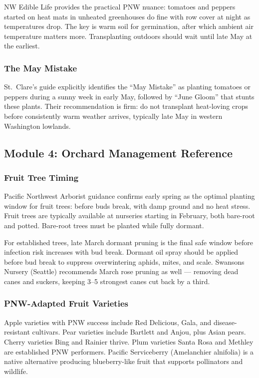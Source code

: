 \documentclass[11pt,letterpaper]{article}
\begin{document}
NW Edible Life provides the practical PNW nuance: tomatoes and peppers started on heat mats in unheated greenhouses do fine with row cover at night as temperatures drop. The key is warm soil for germination, after which ambient air temperature matters more. Transplanting outdoors should wait until late May at the earliest.

\subsubsection{The May Mistake}

St.\ Clare's guide explicitly identifies the ``May Mistake'' as planting tomatoes or peppers during a sunny week in early May, followed by ``June Gloom'' that stunts these plants. Their recommendation is firm: do not transplant heat-loving crops before consistently warm weather arrives, typically late May in western Washington lowlands.

\subsection{Module 4: Orchard Management Reference}

\subsubsection{Fruit Tree Timing}

Pacific Northwest Arborist guidance confirms early spring as the optimal planting window for fruit trees: before buds break, with damp ground and no heat stress. Fruit trees are typically available at nurseries starting in February, both bare-root and potted. Bare-root trees must be planted while fully dormant.

For established trees, late March dormant pruning is the final safe window before infection risk increases with bud break. Dormant oil spray should be applied before bud break to suppress overwintering aphids, mites, and scale. Swansons Nursery (Seattle) recommends March rose pruning as well --- removing dead canes and suckers, keeping 3--5 strongest canes cut back by a third.

\subsubsection{PNW-Adapted Fruit Varieties}

Apple varieties with PNW success include Red Delicious, Gala, and disease-resistant cultivars. Pear varieties include Bartlett and Anjou, plus Asian pears. Cherry varieties Bing and Rainier thrive. Plum varieties Santa Rosa and Methley are established PNW performers. Pacific Serviceberry (Amelanchier alnifolia) is a native alternative producing blueberry-like fruit that supports pollinators and wildlife.
\end{document}
